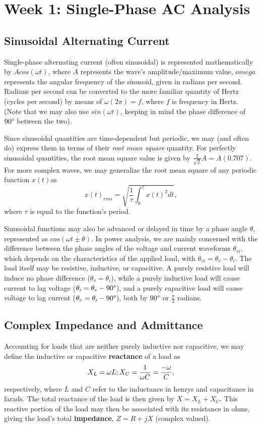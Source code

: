 \documentclass{article}
\begin{document}
\section{Week 1: Single-Phase AC Analysis}
\subsection{Sinusoidal Alternating Current}
Single-phase alternating current (often sinusoidal) is represented mathematically by \(Acos(\omega t)\), where \(A\) represents the wave's amplitude/maximum value, \(omega\) represents the angular frequency of the sinusoid, given in radians per second. Radians per second can be converted to the more familiar quantity of Hertz (cycles per second) by means of \(\omega(2\pi) = f\), where \(f\) is frequency in Hertz. (Note that we may also use \(sin(\omega t)\), keeping in mind the phase difference of \(90\degree\) between the two). 

Since sinusoidal quantities are time-dependent but periodic, we may (and often do) express them in terms of their \textit{root mean square} quantity. For perfectly sinusoidal quantities, the root mean square value is given by \(\frac{2}{\sqrt{2}}A = A(0.707)\). For more complex waves, we may generalize the root mean square of any periodic function \(x(t)\)as \[
	x(t)_{rms} =\sqrt{\frac{1}{\tau}\int_{0}^{\tau}x(t)^{2}dt},
\] 
where \(\tau\) is equal to the function's period.

Sinusoidal functions may also be advanced or delayed in time by a phase angle \(\theta\), represented as \(cos(\omega t \pm \theta)\). In power analysis, we are mainly concerned with the difference between the phase angles of the voltage and current waveforms \(\theta_{vi}\), which depends on the characteristics of the applied load, with \(\theta_{vi} = \theta_{v} - \theta_{i}\).  The load itself may be resistive, inductive, or capacitive. A purely resistive load will induce no phase difference (\(\theta_{v} = \theta_{i}\)), while a purely inductive load will cause current to lag voltage (\(\theta_{i} = \theta_{v} - 90\degree\)), and a purely capacitive load will cause voltage to lag current (\(\theta_{v} = \theta_{i} - 90\degree\)), both by \(90\degree\) or \(\frac{\pi}{2}\) radians.

\subsection{Complex Impedance and Admittance}

Accounting for loads that are neither purely inductive nor capacitive, we may define the inductive or capacitive \textbf{reactance} of a load as \[
  X_L = \omega L \space ; \space X_C = \frac{1}{\omega C} = \frac{-\omega}{C},
\] 
respectively, where \(L\) and \(C\) refer to the inductance in henrys and capacitance in farads. The total reactance of the load is then given by \(X = X_L + X_C\). This reactive portion of the load may then be associated with its resistance in ohms, giving the load's total \textbf{impedance}, \(Z = R + jX\) (complex valued). 
\end{document}
